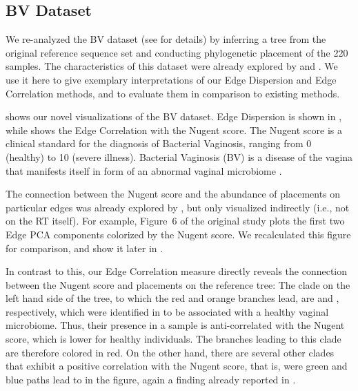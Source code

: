 \subsection{BV Dataset}
\label{ch:Visualization:sec:Results:sub:BVDataset}

We re-analyzed the \acf{BV} dataset (see  for details)
by inferring a tree from the original reference sequence set
and conducting phylogenetic placement of the \num{220} samples.
The characteristics of this dataset were already explored by  and .
We use it here to give exemplary interpretations of our Edge Dispersion and Edge Correlation methods,
and to evaluate them in comparison to existing methods.

 shows our novel visualizations of the \ac{BV} dataset.
Edge Dispersion is shown in ,
while  shows the Edge Correlation with the Nugent score. %
The Nugent score \cite{Nugent1991} is a clinical standard for the diagnosis of Bacterial Vaginosis,
ranging from \num{0} (healthy) to \num{10} (severe illness).
Bacterial Vaginosis (BV) is a disease of the vagina
that manifests itself in form of an abnormal vaginal microbiome \cite{Srinivasan2012}.

The connection between the Nugent score and the abundance of placements on particular edges
was already explored by , but only visualized indirectly (i.e., not on the \ac{RT} itself).
For example, Figure~6 of the original study \cite{Matsen2011a}
plots the first two Edge PCA components colorized by the Nugent score.
We recalculated this figure for comparison, and show it later in .

In contrast to this, our Edge Correlation measure directly reveals
the connection between the Nugent score and placements on the reference tree:
The clade on the left hand side of the tree, to which the red and orange branches lead,
are  and , respectively,
which were identified in  to be associated with a healthy vaginal microbiome.
Thus, their presence in a sample is anti-correlated with the Nugent score, which is lower for healthy individuals.
The branches leading to this clade are therefore colored in red.
On the other hand, there are several other clades that exhibit a positive correlation with the Nugent score,
that is, were green and blue paths lead to in the figure,
again a finding already reported in .

